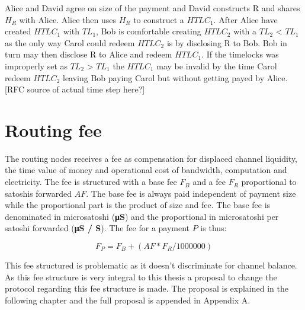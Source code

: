 Alice and David agree on size of the payment and David constructs R and shares $H_{R}$ with Alice. Alice then uses $H_{R}$ to construct a $HTLC_{1}$.
After Alice have created $HTLC_{1}$ with $TL_{1}$, Bob is comfortable creating $HTLC_{2}$ with a $TL_{2}$ < $TL_{1}$ as the only way Carol could redeem $HTLC_{2}$ is by disclosing R to Bob. Bob in turn may then disclose R to Alice and redeem $HTLC_{1}$. If the timelocks was improperly set as $TL_{2}$ > $TL_{1}$ the $HTLC_{1}$ may be invalid by the time Carol redeem $HTLC_{2}$ leaving Bob paying Carol but without getting payed by Alice. [RFC source of actual time step here?]

\section{Routing fee}

The routing nodes receives a fee as compensation for displaced channel liquidity, the time value of money and operational cost of bandwidth, computation and electricity. The fee is structured with a base fee $F_{B}$ and a fee $F_{R}$ proportional to satoshis forwarded $AF$. The base fee is always paid independent of payment size while the proportional part is the product of size and fee. The base fee is denominated in microsatoshi (\textbf{μS}) and the proportional in microsatoshi per satoshi forwarded (\textbf{μS / S}). The fee for a payment $P$ is thus:

\[ F_{P} = F_{B} + (AF * F_{R} / 1000000) \]

This fee structured is problematic as it doesn't discriminate for channel balance. As this fee structure is very integral to this thesis a proposal to change the protocol regarding this fee structure is made. The proposal is explained in the following chapter and the full proposal is appended in Appendix A. 
